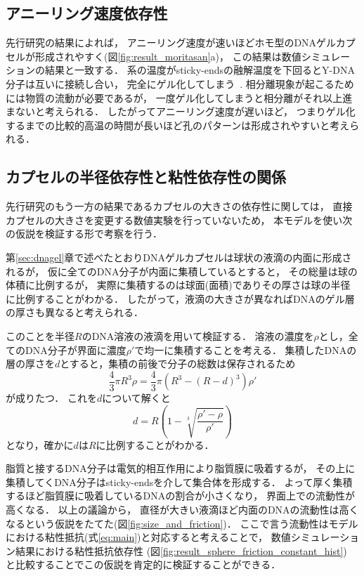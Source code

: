 \subsection{アニーリング速度依存性}

先行研究の結果によれば，
アニーリング速度が速いほどホモ型のDNAゲルカプセルが形成されやすく(図\ref{fig:result_moritasan}a)，
この結果は数値シミュレーションの結果と一致する．
系の温度がsticky-endsの融解温度を下回るとY-DNA分子は互いに接続し合い，
完全にゲル化してしまう~\cite{sato2019sequence}.
相分離現象が起こるためには物質の流動が必要であるが，
一度ゲル化してしまうと相分離がそれ以上進まないと考えられる．
したがってアニーリング速度が遅いほど，
つまりゲル化するまでの比較的高温の時間が長いほど孔のパターンは形成されやすいと考えられる．


\subsection{カプセルの半径依存性と粘性依存性の関係}

先行研究のもう一方の結果であるカプセルの大きさの依存性に関しては，
直接カプセルの大きさを変更する数値実験を行っていないため，
本モデルを使い次の仮説を検証する形で考察を行う．

第\ref{sec:dnagel}章で述べたとおりDNAゲルカプセルは球状の液滴の内面に形成されるが，
仮に全てのDNA分子が内面に集積しているとすると，
その総量は球の体積に比例するが，
実際に集積するのは球面(面積)でありその厚さは球の半径に比例することがわかる．
したがって，液滴の大きさが異なればDNAのゲル層の厚さも異なると考えられる．

このことを半径$R$のDNA溶液の液滴を用いて検証する．
溶液の濃度を$\rho$とし，全てのDNA分子が界面に濃度$\rho'$で均一に集積することを考える．
集積したDNAの層の厚さを$d$とすると，集積の前後で分子の総数は保存されるため
\begin{equation}
    \frac{4}{3}\pi R^3 \rho = \frac{4}{3}\pi (R^3-(R-d)^3)\rho'
\end{equation}
が成りたつ．
これを$d$について解くと
\begin{equation}
    d = R(1-\sqrt[3]{\frac{\rho'-\rho}{\rho'}})
\end{equation}
となり，確かに$d$は$R$に比例することがわかる．

脂質と接するDNA分子は電気的相互作用により脂質膜に吸着するが，
その上に集積してくDNA分子はsticky-endsを介して集合体を形成する．
よって厚く集積するほど脂質膜に吸着しているDNAの割合が小さくなり，
界面上での流動性が高くなる．
以上の議論から，
直径が大きい液滴ほど内面のDNAの流動性は高くなるという仮説をたてた(図\ref{fig:size_and_friction})．
ここで言う流動性はモデルにおける粘性抵抗(式\ref{eq:main})と対応すると考えることで，
数値シミュレーション結果における粘性抵抗依存性
(図\ref{fig:result_sphere_friction_constant_hist})
と比較することでこの仮説を肯定的に検証することができる．

